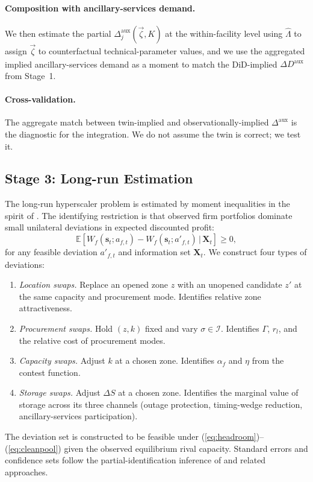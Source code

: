 \documentclass[12pt,letterpaper]{article}
\begin{document}
\paragraph{Composition with ancillary-services demand.} We then estimate
the partial $\Delta^{\text{aux}}_j(\vec\zeta, K)$ at the within-facility
level using $\hat\Lambda$ to assign $\vec\zeta$ to counterfactual
technical-parameter values, and we use the aggregated implied
ancillary-services demand as a moment to match the DiD-implied
$\widehat{\Delta D^{\text{aux}}}$ from Stage~1.

\paragraph{Cross-validation.} The aggregate match between
twin-implied and observationally-implied $\Delta^{\text{aux}}$ is the
diagnostic for the integration. We do not assume the twin is correct;
we test it.

\subsection{Stage 3: Long-run Estimation}
\label{sec:est_long}

The long-run hyperscaler problem is estimated by moment inequalities in
the spirit of \citet{holmes2011walmart}. The identifying restriction is
that observed firm portfolios dominate small unilateral deviations in
expected discounted profit:
\begin{equation}
\label{eq:moment_ineq}
\mathbb{E}\!\left[W_f(\mathbf{s}_t; a_{f,t}) - W_f(\mathbf{s}_t; a'_{f,t})
\,\Big|\, \mathbf{X}_t \right] \geq 0,
\end{equation}
for any feasible deviation $a'_{f,t}$ and information set $\mathbf{X}_t$.
We construct four types of deviations:
\begin{enumerate}[leftmargin=*]
    \item \emph{Location swaps.} Replace an opened zone $z$ with an
    unopened candidate $z'$ at the same capacity and procurement mode.
    Identifies relative zone attractiveness.
    \item \emph{Procurement swaps.} Hold $(z,k)$ fixed and vary $\sigma \in
    \mathcal{I}$. Identifies $\Gamma$, $r_l$, and the relative cost of
    procurement modes.
    \item \emph{Capacity swaps.} Adjust $k$ at a chosen zone. Identifies
    $\alpha_f$ and $\eta$ from the contest function.
    \item \emph{Storage swaps.} Adjust $\Delta S$ at a chosen zone.
    Identifies the marginal value of storage across its three channels
    (outage protection, timing-wedge reduction, ancillary-services
    participation).
\end{enumerate}
The deviation set is constructed to be feasible under
(\ref{eq:headroom})--(\ref{eq:cleanpool}) given the observed equilibrium
rival capacity. Standard errors and confidence sets follow the
partial-identification inference of \citet{andrews2010inference} and
related approaches.
\end{document}
